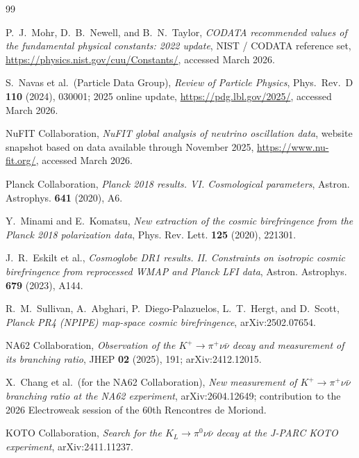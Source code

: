 \begin{thebibliography}{99}

P.~J.~Mohr, D.~B.~Newell, and B.~N.~Taylor,
\newblock \emph{CODATA recommended values of the fundamental physical constants: 2022 update},
\newblock NIST / CODATA reference set, \url{https://physics.nist.gov/cuu/Constants/}, accessed March 2026.

S.~Navas et al.\ (Particle Data Group),
\newblock \emph{Review of Particle Physics},
\newblock Phys.\ Rev.\ D \textbf{110} (2024), 030001; 2025 online update, \url{https://pdg.lbl.gov/2025/}, accessed March 2026.

NuFIT Collaboration,
\newblock \emph{NuFIT global analysis of neutrino oscillation data},
\newblock website snapshot based on data available through November 2025, \url{https://www.nu-fit.org/}, accessed March 2026.

Planck Collaboration,
\newblock \emph{Planck 2018 results. VI. Cosmological parameters},
\newblock Astron. Astrophys. \textbf{641} (2020), A6.

Y.~Minami and E.~Komatsu,
\newblock \emph{New extraction of the cosmic birefringence from the Planck 2018 polarization data},
\newblock Phys. Rev. Lett. \textbf{125} (2020), 221301.

J.~R.~Eskilt et al.,
\newblock \emph{Cosmoglobe DR1 results. II. Constraints on isotropic cosmic birefringence from reprocessed WMAP and Planck LFI data},
\newblock Astron. Astrophys. \textbf{679} (2023), A144.

R.~M.~Sullivan, A.~Abghari, P.~Diego-Palazuelos, L.~T.~Hergt, and D.~Scott,
\newblock \emph{Planck PR4 (NPIPE) map-space cosmic birefringence},
\newblock arXiv:2502.07654.

NA62 Collaboration,
\newblock \emph{Observation of the $K^{+}\to\pi^{+}\nu\bar{\nu}$ decay and measurement of its branching ratio},
\newblock JHEP \textbf{02} (2025), 191; arXiv:2412.12015.

X.~Chang et al.\ (for the NA62 Collaboration),
\newblock \emph{New measurement of $K^{+}\to\pi^{+}\nu\bar{\nu}$ branching ratio at the NA62 experiment},
\newblock arXiv:2604.12649; contribution to the 2026 Electroweak session of the 60th Rencontres de Moriond.

KOTO Collaboration,
\newblock \emph{Search for the $K_{L}\to\pi^{0}\nu\bar{\nu}$ decay at the J-PARC KOTO experiment},
\newblock arXiv:2411.11237.

\end{thebibliography}
